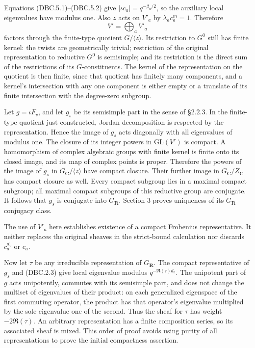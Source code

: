 \documentclass[
]{report}
\begin{document}
Equations (DBC.5.1)--(DBC.5.2) give \(|\iota c_a|=q^{-\beta_a/2}\), so
the auxiliary local eigenvalues have modulus one. Also \(z\) acts on
\(V'_a\) by \(\lambda_a c_a^m=1\). Therefore \[
V'=\bigoplus_a V'_a
\] factors through the finite-type quotient \(G/\langle z\rangle\). Its
restriction to \(G^0\) still has finite kernel: the twists are
geometrically trivial; restriction of the original representation to
reductive \(G^0\) is semisimple; and its restriction is the direct sum
of the restrictions of its \(G\)-constituents. The kernel of the
representation on the quotient is then finite, since that quotient has
finitely many components, and a kernel's intersection with any one
component is either empty or a translate of its finite intersection with
the degree-zero subgroup.

Let \(g=\iota F_v\), and let \(g_s\) be its semisimple part in the sense
of §2.2.3. In the finite-type quotient just constructed, Jordan
decomposition is respected by the representation. Hence the image of
\(g_s\) acts diagonally with all eigenvalues of modulus one. The closure
of its integer powers in \(\mathrm{GL}(V')\) is compact. A homomorphism
of complex algebraic groups with finite kernel is finite onto its closed
image, and its map of complex points is proper. Therefore the powers of
the image of \(g_s\) in \(G_{\mathbf C}/\langle z\rangle\) have compact
closure. Their further image in \(G_{\mathbf C}/Z_{\mathbf C}\) has
compact closure as well. Every compact subgroup lies in a maximal
compact subgroup; all maximal compact subgroups of this reductive group
are conjugate. It follows that \(g_s\) is conjugate into
\(G_{\mathbf R}\). Section 3 proves uniqueness of its
\(G_{\mathbf R}\)-conjugacy class.

The use of \(V'_a\) here establishes existence of a compact Frobenius
representative. It neither replaces the original sheaves in the
strict-bound calculation nor discards \(c_a^{d_v}\) or \(c_a\).

Now let \(\tau\) be any irreducible representation of \(G_{\mathbf R}\).
The compact representative of \(g_s\) and (DBC.2.3) give local
eigenvalue modulus \(q^{-\Re(\tau)d_v}\). The unipotent part of \(g\)
acts unipotently, commutes with its semisimple part, and does not change
the multiset of eigenvalues of their product: on each generalized
eigenspace of the first commuting operator, the product has that
operator's eigenvalue multiplied by the sole eigenvalue one of the
second. Thus the sheaf for \(\tau\) has weight \(-2\Re(\tau)\). An
arbitrary representation has a finite composition series, so its
associated sheaf is mixed. This order of proof avoids using purity of
all representations to prove the initial compactness assertion.
\end{document}
